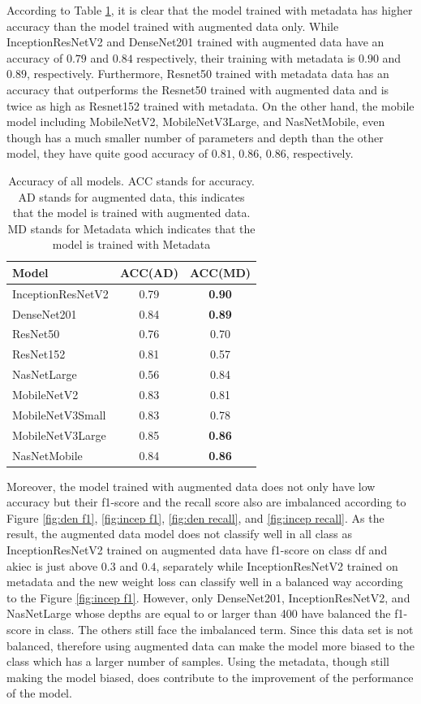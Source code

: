 \documentclass[sensors,article,submit,pdftex,moreauthors]{Definitions/mdpi}
\begin{document}
	According to Table \ref{table:overall-acc}, it is clear that the model trained with metadata has higher accuracy than the model trained with augmented data only. While InceptionResNetV2 and DenseNet201 trained with augmented data have an accuracy of $0.79$ and $0.84$ respectively, their training with metadata is $0.90$ and $0.89$, respectively. Furthermore, Resnet50 trained with metadata data has an accuracy that outperforms the Resnet50 trained with augmented data and is twice as high as Resnet152 trained with metadata. On the other hand, the mobile model including MobileNetV2, MobileNetV3Large, and NasNetMobile, even though has a much smaller number of parameters and depth than the other model, they have quite good accuracy of $0.81$, $0.86$, $0.86$, respectively. 
	
	\begin{table}[H]
		\centering
		\begin{tabular}{| l | c  c | }
			\hline
			Model & ACC(AD) & ACC(MD)\\ 
			\hline
			InceptionResNetV2 & 0.79 & \textbf{0.90}\\
			\hline
			DenseNet201 & 0.84 & \textbf{0.89}\\
			\hline
			ResNet50 & 0.76 & 0.70\\
			\hline
			ResNet152 & 0.81 & 0.57\\
			\hline
			NasNetLarge & 0.56 & 0.84\\
			\hline
			MobileNetV2 & 0.83 & 0.81\\
			\hline
			MobileNetV3Small & 0.83 & 0.78\\
			\hline
			MobileNetV3Large & 0.85 & \textbf{0.86}\\
			\hline
			NasNetMobile & 0.84 & \textbf{0.86}\\
			\hline
		\end{tabular}
		\caption{Accuracy of all models. ACC stands for accuracy. AD stands for augmented data, this indicates that the model is trained with augmented data. MD stands for Metadata which indicates that the model is trained with Metadata}
		\label{table:overall-acc}
	\end{table}
	
	Moreover, the model trained with augmented data does not only have low accuracy but their f1-score and the recall score also are imbalanced according to Figure \ref{fig:den f1}, \ref{fig:incep f1}, \ref{fig:den recall}, and \ref{fig:incep recall}. As the result, the augmented data model does not classify well in all class as InceptionResNetV2 trained on augmented data have f1-score on class df and akiec is just above $0.3$ and $0.4$, separately while InceptionResNetV2 trained on metadata and the new weight loss can classify well in a balanced way according to the Figure \ref{fig:incep f1}. However, only DenseNet201, InceptionResNetV2, and NasNetLarge whose depths are equal to or larger than 400 have balanced the f1-score in class. The others still face the imbalanced term. Since this data set is not balanced, therefore using augmented data can make the model more biased to the class which has a larger number of samples. Using the metadata, though still making the model biased, does contribute to the improvement of the performance of the model.
	
\end{document}
